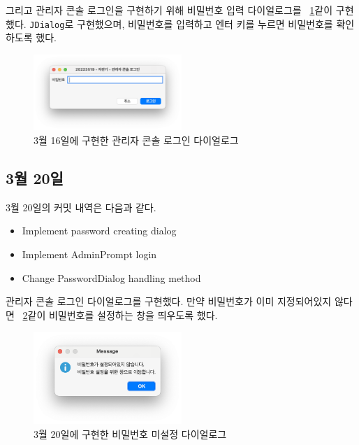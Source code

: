 \documentclass{oblivoir}
\newcommand{\figref}[1]{\figurename~\ref{#1}}
\begin{document}
    그리고 관리자 콘솔 로그인을 구현하기 위해 비밀번호 입력 다이얼로그를 \figref{fig:0316-password-dialog}\와 같이 구현했다.
    \texttt{JDialog}로 구현했으며, 비밀번호를 입력하고 엔터 키를 누르면 비밀번호를 확인하도록 했다.
    \begin{figure}[h]
        \centering
        \includegraphics[width=0.5\textwidth]{images/dev-snapshop/0316-password-dialog}
        \caption{3월 16일에 구현한 관리자 콘솔 로그인 다이얼로그}
        \label{fig:0316-password-dialog}
    \end{figure}

    \subsection{3월 20일}

    3월 20일의 커밋 내역은 다음과 같다.
    \begin{itemize}
        \item Implement password creating dialog
        \item Implement AdminPrompt login
        \item Change PasswordDialog handling method
    \end{itemize}

    관리자 콘솔 로그인 다이얼로그를 구현했다.
    만약 비밀번호가 이미 지정되어있지 않다면 \figref{fig:0320-password-not-set}\와 같이
    비밀번호를 설정하는 창을 띄우도록 했다.
    \begin{figure}[h]
        \centering
        \includegraphics[width=0.5\textwidth]{images/dev-snapshop/0320-password-not-set}
        \caption{3월 20일에 구현한 비밀번호 미설정 다이얼로그}
        \label{fig:0320-password-not-set}
    \end{figure}
\end{document}
